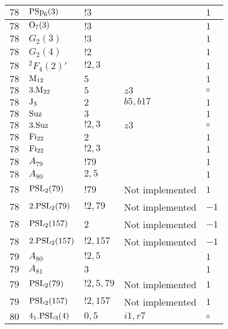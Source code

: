 \documentclass[a4paper, 11pt]{article}
\begin{document}
\begin{longtable}{lllll}
        $ 78 $ & $ {\rm PSp}_{6}(3) $ & $ ! 3 $ & $ ~ $ & $ 1$ \\ \hline
        $ 78 $ & $ {\rm O}_{7}(3) $ & $ ! 3 $ & $ ~ $ & $ 1$ \\ \hline
        $ 78 $ & $ G_{2}(3) $ & $ ! 3 $ & $ ~ $ & $ 1$ \\ \hline
        $ 78 $ & $ G_{2}(4) $ & $ ! 2 $ & $ ~ $ & $ 1$ \\ \hline
        $ 78 $ & $ {}^{2}F_{4}(2)' $ & $ ! 2,3 $ & $ ~ $ & $ 1$ \\ \hline
        $ 78 $ & $ {\rm M}_{12} $ & $ 5 $ & $ ~ $ & $ 1$ \\ \hline
        $ 78 $ & $ 3.{\rm M}_{22} $ & $ 5 $ & $ z3 $ &  $\circ$ \\ \hline
        $ 78 $ & $ {\rm J}_3 $ & $ 2 $ & $ b5, b17 $ & $ 1$ \\ \hline
        $ 78 $ & $ {\rm Suz} $ & $ 3 $ & $ ~ $ & $ 1$ \\ \hline
        $ 78 $ & $ 3.{\rm Suz} $ & $ ! 2,3 $ & $ z3 $ &  $\circ$ \\ \hline
        $ 78 $ & $ {\rm Fi}_{22} $ & $ 2 $ & $ ~ $ & $ 1$ \\ \hline
        $ 78 $ & $ {\rm Fi}_{22} $ & $ ! 2,3 $ & $ ~ $ & $ 1$ \\ \hline
        $ 78 $ & $ A_{79} $ & $ !79 $ & $ ~ $ & $ 1$ \\ \hline
        $ 78 $ & $ A_{80} $ & $ 2, 5 $ & $ ~ $ & $ 1$ \\ \hline
        $ 78 $ & $ {\rm PSL}_{2}(79) $ & $ !79 $ &  Not implemented & $ 1$ \\ \hline
        $ 78 $ & $ 2.{\rm PSL}_{2}(79) $ & $ !2, 79 $ &  Not implemented & $ -1$ \\ \hline
        $ 78 $ & $ {\rm PSL}_{2}(157) $ & $ 2 $ &  Not implemented & $ -1$ \\ \hline
        $ 78 $ & $ 2.{\rm PSL}_{2}(157) $ & $ !2, 157 $ &  Not implemented & $ -1$ \\ \hline
        $ 79 $ & $ A_{80} $ & $ !2, 5 $ & $ ~ $ & $ 1$ \\ \hline
        $ 79 $ & $ A_{81} $ & $ 3 $ & $ ~ $ & $ 1$ \\ \hline
        $ 79 $ & $ {\rm PSL}_{2}(79) $ & $ !2, 5, 79 $ &  Not implemented & $ 1$ \\ \hline
        $ 79 $ & $ {\rm PSL}_{2}(157) $ & $ !2, 157 $ &  Not implemented & $ 1$ \\ \hline
        $ 80 $ & $ 4_1.{\rm PSL}_{3}(4) $ & $ 0,5 $ & $ i1, r7 $ &  $\circ$ \\ \hline

\end{longtable}
\end{document}
